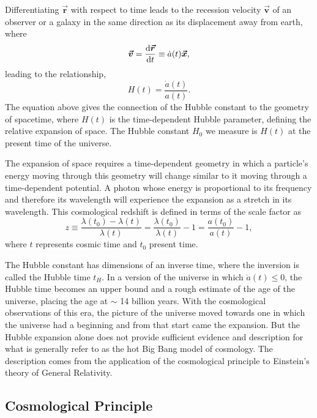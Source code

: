 Differentiating $\boldsymbol{\vec{r}}$ with respect to time leads to the recession velocity $\boldsymbol{\vec{v}}$ of an observer or a galaxy in the same direction as its displacement away from earth, where
%
\begin{equation}
  \boldsymbol{\vec{v}} = \dv{\boldsymbol{\vec{r}}}{t} \equiv  \dot{a}(t)\boldsymbol{\vec{x}},
\end{equation}
%
leading to the relationship,
%
\begin{equation}
  H(t) = \frac{\dot{a}(t)}{a(t)}.
\end{equation}
%
The equation above gives the connection of the Hubble constant to the geometry of spacetime, where $H(t)$ is the time-dependent Hubble parameter, defining the relative expansion of space. The Hubble constant $H_0$ we measure is $H(t)$ at the present time of the universe.

The expansion of space requires a time-dependent geometry in which a particle's energy moving through this geometry will change similar to it moving through a time-dependent potential. A photon whose energy is proportional to its frequency and therefore its wavelength will experience the expansion as a stretch in its wavelength. This cosmological redshift is defined in terms of the scale factor as
%
\begin{equation}
  z \equiv \frac{\lambda(t_0) - \lambda(t)}{\lambda(t)} = \frac{\lambda(t_0)}{\lambda(t)} -1 = \frac{a(t_0)}{a(t)} - 1,
\end{equation}
%
where $t$ represents cosmic time and $t_0$ present time.

The Hubble constant has dimensions of an inverse time, where the inversion is called the Hubble time $t_H$. In a version of the universe in which $\ddot{a}(t) \leq 0$, the Hubble time becomes an upper bound and a rough estimate of the age of the universe, placing the age at $\sim$ 14 billion years. With the cosmological observations of this era, the picture of the universe moved towards one in which the universe had a beginning and from that start came the expansion. But the Hubble expansion alone does not provide sufficient evidence and description for what is generally refer to as the hot Big Bang model of cosmology. The description comes from the application of the cosmological principle to Einstein's theory of General Relativity.

\subsection{Cosmological Principle}
\label{subsec:cosmological_principle}


